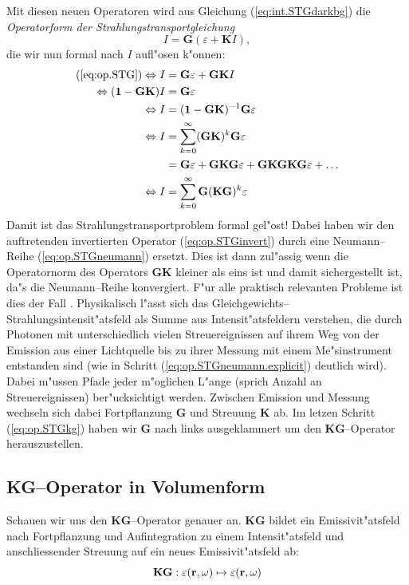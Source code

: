 \documentclass[11pt,a4paper,DIVcalc,BCOR8mm,titlepage,twoside]{scrartcl}
\begin{document}
	Mit diesen neuen Operatoren wird aus Gleichung (\ref{eq:int.STGdarkbg}) die {\em Operatorform der Strahlungstransportgleichung}
	\begin{equation}
		I=\mathbf{G}(\varepsilon + \mathbf{K}I),
		\label{eq:op.STG}
	\end{equation}
	die wir nun formal nach $I$ aufl"osen k"onnen:
	\begin{align}
		(\ref{eq:op.STG}) \Leftrightarrow I&=\mathbf{G}\varepsilon + \mathbf{GK}I \nonumber \\
		\Leftrightarrow (\mathbf{1}-\mathbf{GK})I &= \mathbf{G}\varepsilon \nonumber \\
		\Leftrightarrow I &= (\mathbf{1}-\mathbf{GK})^{-1}\mathbf{G}\varepsilon \label{eq:op.STGinvert} \\
		\Leftrightarrow I &= \sum_{k=0}^\infty (\mathbf{GK})^k \mathbf{G}\varepsilon \label{eq:op.STGneumann} \\
		&=\mathbf{G}\varepsilon + \mathbf{GKG}\varepsilon + \mathbf{GKGKG}\varepsilon + \hdots \label{eq:op.STGneumann.explicit} \\
		\Leftrightarrow I &=\sum_{k=0}^\infty \mathbf{G} (\mathbf{KG})^k \varepsilon \label{eq:op.STGkg}
	\end{align}
	Damit ist das Strahlungstransportproblem formal gel"ost! Dabei haben wir den auftretenden invertierten Operator (\ref{eq:op.STGinvert}) durch eine Neumann--Reihe (\ref{eq:op.STGneumann}) ersetzt. Dies ist dann zul"assig wenn die Operatornorm des Operators $\mathbf{GK}$ kleiner als eins ist und damit sichergestellt ist, da"s die Neumann--Reihe konvergiert. F"ur alle praktisch relevanten Probleme ist dies der Fall \citep[siehe][Theorem 12 und 13]{Arvo:1995p9257}. Physikalisch l"asst sich das Gleichgewichts--Strahlungsintensit"atsfeld als Summe aus Intensit"atsfeldern verstehen, die durch Photonen mit unterschiedlich vielen Streuereignissen auf ihrem Weg von der Emission aus einer Lichtquelle bis zu ihrer Messung mit einem Me"sinstrument entstanden sind (wie in Schritt (\ref{eq:op.STGneumann.explicit}) deutlich wird). Dabei m"ussen Pfade jeder m"oglichen L"ange (sprich Anzahl an Streuereignissen) ber"ucksichtigt werden. Zwischen Emission und Messung wechseln sich dabei Fortpflanzung $\mathbf{G}$ und Streuung $\mathbf{K}$ ab. Im letzen Schritt (\ref{eq:op.STGkg}) haben wir $\mathbf{G}$ nach links ausgeklammert um den $\mathbf{KG}$--Operator herauszustellen.
	
	
	\subsection{KG--Operator in Volumenform}
	Schauen wir uns den $\mathbf{KG}$--Operator genauer an. $\mathbf{KG}$ bildet ein Emissivit"atsfeld nach Fortpflanzung und Aufintegration zu einem Intensit"atsfeld und anschliessender Streuung auf ein neues Emissivit"atsfeld ab:
	\begin{equation*}
		\mathbf{KG} : \varepsilon(\mathbf{r},\omega) \mapsto \varepsilon(\mathbf{r},\omega)
	\end{equation*}
\end{document}

